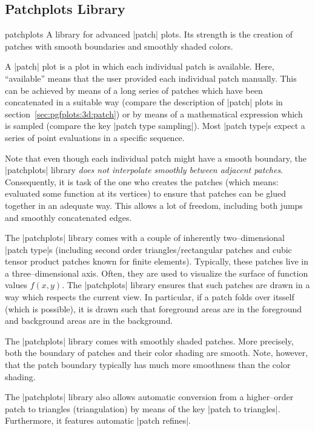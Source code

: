 \subsection{Patchplots Library}
{
%
\label{sec:lib:patchplots}
\begin{pgfplotslibrary}{patchplots}
	A library for advanced |patch| plots. Its strength is the creation of patches with smooth boundaries and smoothly shaded colors.
	
	A |patch| plot is a plot in which each individual patch is available. Here, ``available'' means that the user provided each individual patch manually. This can be achieved by means of a long series of patches which have been concatenated in a suitable way (compare the description of |patch| plots in section~\ref{sec:pgfplots:3d:patch}) or by means of a mathematical expression which is sampled (compare the key |patch type sampling|). Most |patch type|s expect a series of point evaluations in a specific sequence.
	
	Note that even though each individual patch might have a smooth boundary, the |patchplots| library \emph{does not interpolate smoothly between adjacent patches}. Consequently, it is task of the one who creates the patches (which means: evaluated some function at its vertices) to ensure that patches can be glued together in an adequate way. This allows a lot of freedom, including both jumps and smoothly concatenated edges. 

	The |patchplots| library comes with a couple of inherently two--dimensional |patch type|s (including second order triangles/rectangular patches and cubic tensor product patches known for finite elements). Typically, these patches live in a three--dimensional axis. Often, they are used to visualize the surface of function values $f(x,y)$. The |patchplots| library ensures that such patches are drawn in a way which respects the current view. In particular, if a patch folds over itsself (which is possible), it is drawn such that foreground areas are in the foreground and background areas are in the background.

	The |patchplots| library comes with smoothly shaded patches. More precisely, both the boundary of patches and their color shading are smooth. Note, however, that the patch boundary typically has much more smoothness than the color shading. 

	The |patchplots| library also allows automatic conversion from a higher--order patch to triangles (triangulation) by means of the key |patch to triangles|. Furthermore, it features automatic |patch refines|.



\end{pgfplotslibrary}}
